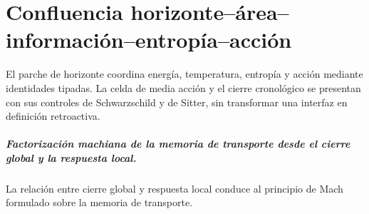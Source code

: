 \chapter{Confluencia horizonte–área–información–entropía–acción}
\label{chap:parte-iv-69}

El parche de horizonte coordina energía, temperatura, entropía y acción mediante identidades tipadas. La celda de media acción y el cierre cronológico se presentan con sus controles de Schwarzschild y de Sitter, sin transformar una interfaz en definición retroactiva.



\paragraph{Factorización machiana de la memoria de transporte desde el cierre global y la respuesta local.} La relación entre cierre global y respuesta local conduce al principio de Mach formulado sobre la memoria de transporte.
